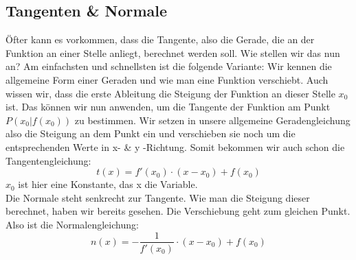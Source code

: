 \subsection{Tangenten \& Normale}
Öfter kann es vorkommen, dass die Tangente, also die Gerade, die an der Funktion an einer Stelle anliegt, berechnet werden soll. Wie stellen wir das nun an? Am einfachsten und schnellsten ist die folgende Variante: Wir kennen die allgemeine Form einer Geraden und wie man eine Funktion verschiebt. Auch wissen wir, dass die erste Ableitung die Steigung der Funktion an dieser Stelle \(x_0\) ist. Das können wir nun anwenden, um die Tangente der Funktion am Punkt \(P(x_0|f(x_0))\) zu bestimmen. Wir setzen in unsere allgemeine Geradengleichung also die Steigung an dem Punkt ein und verschieben sie noch um die entsprechenden Werte in x- \& y -Richtung. Somit bekommen wir auch schon die Tangentengleichung:
\[t(x)=f'(x_0)\cdot (x-x_0)+f(x_0)\]
\(x_0\) ist hier eine Konstante, das x die Variable.\\
Die Normale steht senkrecht zur Tangente. Wie man die Steigung dieser berechnet, haben wir bereits gesehen. Die Verschiebung geht zum gleichen Punkt. Also ist die Normalengleichung:
\[n(x)=-\frac{1}{f'(x_0)}\cdot (x-x_0)+f(x_0)\]
